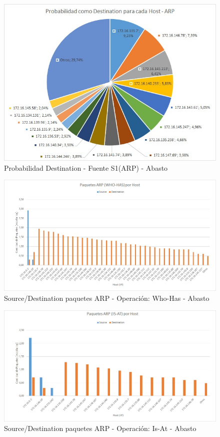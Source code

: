 \begin{figure}[h!]
\centering
\includegraphics[scale=0.6]{./img/proba_dst_abasto.jpg}
\caption{Probabilidad Destination - Fuente S1(ARP) - Abasto}
\end{figure}
\newpage



\begin{figure}[h!]
\centering
\includegraphics[scale=0.7]{./img/arp_whoHas_abasto.jpg}
\caption{Source/Destination paquetes ARP - Operación: Who-Has - Abasto}
\end{figure}

\begin{figure}[h!]
\centering
\includegraphics[scale=0.7]{./img/arp_isAt_abasto.jpg}
\caption{Source/Destination paquetes ARP - Operación: Is-At - Abasto}
\end{figure}
\newpage

